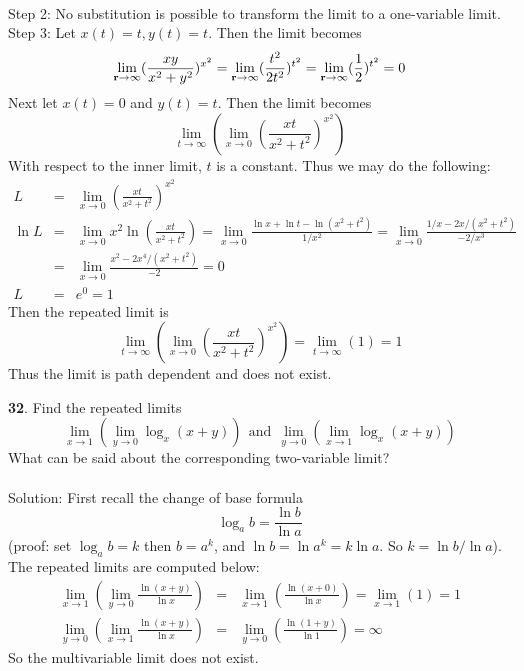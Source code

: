 \documentclass[12pt]{amsbook}
\begin{document}
\begin{enumerate}
\\
{\sf Step 2}: No substitution is possible to transform the limit to a one-variable
limit.
\\
{\sf Step 3}: Let $x(t)=t, y(t)=t$. Then the limit becomes
$$\lim_{{\bf r} \rightarrow \infty} (\frac{xy}{x^2+y^2})^{x^2}=\lim_{{\bf r} \rightarrow \infty} (\frac{t^2}{2t^2})^{t^2}=\lim_{{\bf r} \rightarrow \infty} (\frac{1}{2})^{t^2}=0$$
Next let $x(t)=0$ and $y(t)=t$. Then the limit becomes
$$\lim_{t \rightarrow \infty}(\lim_{x \rightarrow 0}(\frac{xt}{x^2+t^2})^{x^2})$$
With respect to the inner limit, $t$ is a constant. Thus we may do the following:
\begin{eqnarray*}
L&=&\lim_{x \rightarrow 0}(\frac{xt}{x^2+t^2})^{x^2}\\
\ln L &=& \lim_{x \rightarrow 0}x^2\ln(\frac{xt}{x^2+t^2}) = \lim_{x \rightarrow 0}\frac{\ln x+\ln t-\ln(x^2+t^2)}{1/x^2} = \lim_{x \rightarrow 0}\frac{1/x-2x/(x^2+t^2)}{-2/x^3} \\
&=& \lim_{x \rightarrow 0}\frac{x^2-2x^4/(x^2+t^2)}{-2}=0 \\
L&=&e^0=1
\end{eqnarray*}
Then the repeated limit is
$$\lim_{t \rightarrow \infty}(\lim_{x \rightarrow 0}(\frac{xt}{x^2+t^2})^{x^2})=\lim_{t \rightarrow \infty}(1)=1$$
Thus the limit is path dependent and does not exist.
\end{enumerate}

\noindent
{\small\bf 32}. Find the repeated limits
$$\lim_{x \rightarrow 1}(\lim_{y \rightarrow 0} \log_x(x+y)) \ \ \text{and} \ \ \lim_{y \rightarrow 0}(\lim_{x \rightarrow 1} \log_x(x+y))$$
What can be said about the corresponding two-variable limit?
\\
\\
{\sc Solution}: First recall the change of base formula
$$\log_a b= \frac{\ln b}{\ln a}$$
(proof: set $\log_a b=k$ then $b=a^k$, and $\ln b=\ln a^k=k\ln a$. So $k=\ln b/\ln a$). The repeated limits are computed below:
\begin{eqnarray*}
\lim_{x \rightarrow 1}(\lim_{y \rightarrow 0} \frac{\ln (x+y)}{\ln x})&=&\lim_{x \rightarrow 1}(\frac{\ln (x+0)}{\ln x})=\lim_{x \rightarrow 1}(1)=1 \\
\lim_{y \rightarrow 0}(\lim_{x \rightarrow 1} \frac{\ln (x+y)}{\ln x})&=&\lim_{y \rightarrow 0}( \frac{\ln (1+y)}{\ln 1})=\infty
\end{eqnarray*}
So the multivariable limit does not exist. 

\newpage
\end{document}
